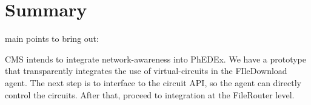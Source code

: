 \section{Summary}
main points to bring out:

CMS intends to integrate network-awareness into PhEDEx. We have a prototype that transparently integrates the use of virtual-circuits in the FIleDownload agent. The next step is to interface to the circuit API, so the agent can directly control the circuits. After that, proceed to integration at the FileRouter level.
